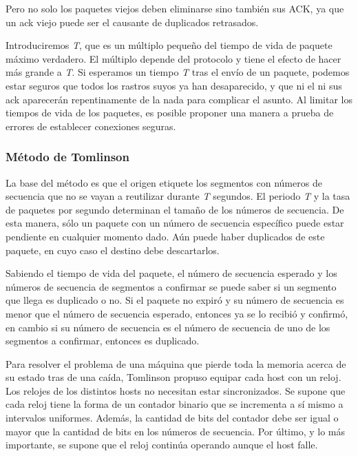 \documentclass[10pt,a4paper]{report}
\begin{document}
	\par Pero no solo los paquetes viejos deben eliminarse sino también sus ACK, ya que un ack viejo puede ser el causante de duplicados retrasados.

	\par Introduciremos \textit{T}, que es un múltiplo pequeño del tiempo de vida de paquete máximo verdadero. El múltiplo depende del protocolo y tiene el efecto de hacer más grande a \textit{T}. Si esperamos un tiempo \textit{T} tras el envío de un paquete, podemos estar seguros que todos los rastros suyos ya han desaparecido, y que ni el ni sus ack aparecerán repentinamente de la nada para complicar el asunto. Al limitar los tiempos de vida de los paquetes, es posible proponer una manera a prueba de errores de establecer conexiones seguras.

	\subsubsection{Método de Tomlinson}

		\par La base del método es que el origen etiquete los segmentos con números de secuencia que no se vayan a reutilizar durante \textit{T} segundos. El periodo \textit{T} y la tasa de paquetes por segundo determinan el tamaño de los números de secuencia. De esta manera, sólo un paquete con un número de secuencia específico puede estar pendiente en cualquier momento dado. Aún puede haber duplicados de este paquete, en cuyo caso el destino debe descartarlos.

		\par Sabiendo el tiempo de vida del paquete, el número de secuencia esperado y los números de secuencia de segmentos a confirmar se puede saber si un segmento que llega es duplicado o no. Si el paquete no expiró y su número de secuencia es menor que el número de secuencia esperado, entonces ya se lo recibió y confirmó, en cambio si su número de secuencia es el número de secuencia de uno de los segmentos a confirmar, entonces es duplicado.

		\par Para resolver el problema de una máquina que pierde toda la memoria acerca de su estado tras de una caída, Tomlinson propuso equipar cada host con un reloj. Los relojes de los distintos hosts no necesitan estar sincronizados. Se supone que cada reloj tiene la forma de un contador binario que se incrementa a sí mismo a intervalos uniformes. Además, la cantidad de bits del contador debe ser igual o mayor que la cantidad de bits en los números de secuencia. Por último, y lo más importante, se supone que el reloj continúa operando aunque el host falle.
\end{document}
